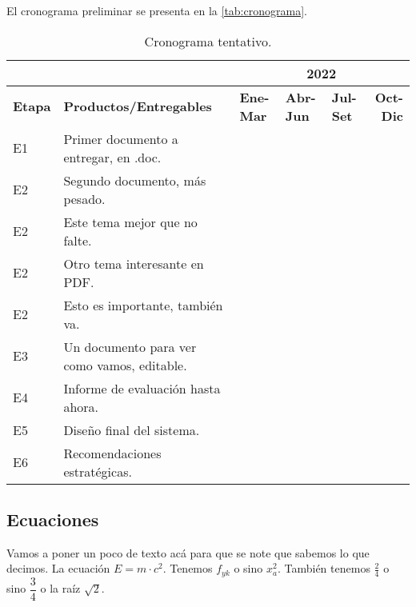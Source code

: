 El cronograma preliminar se presenta en la \autoref{tab:cronograma}.
	
\begin{table}[h]
	\centering
	\caption{Cronograma tentativo.}
	{\color{grayblack}
	\begin{tabular}{p{2.2em}p{14em}lllr}
		\multicolumn{1}{l}{} & \multicolumn{1}{r}{} & \multicolumn{4}{c}{\textbf{2022}} \\
		\midrule
		\textbf{Etapa} & \textbf{Productos/Entregables} & \multicolumn{1}{p{4.055em}}{\textbf{Ene-Mar}} & \multicolumn{1}{p{4.055em}}{\textbf{Abr-Jun}} & \multicolumn{1}{p{4.055em}}{\textbf{Jul-Set}} & \multicolumn{1}{p{4.055em}}{\textbf{Oct-Dic}} \\
		\midrule
		E1    & Primer documento a entregar, en .doc. &       & \cellcolor[rgb]{ .718,  .871,  .91} &       &  \\
		E2    & Segundo documento, más pesado. & \cellcolor[rgb]{ .776,  .89,  .859} &       &       &  \\
		E2    & Este tema mejor que no falte. &       & \cellcolor[rgb]{ .776,  .89,  .859} &       &  \\
		E2    & Otro tema interesante en PDF. &       &       & \cellcolor[rgb]{ .776,  .89,  .859} &  \\
		E2    & Esto es importante, también va. &       &       & \cellcolor[rgb]{ .776,  .89,  .859} &  \\
		E3    & Un documento para ver como vamos, editable. &       & \cellcolor[rgb]{ .722,  .804,  .894} &       &  \\
		E4    & Informe de evaluación hasta ahora. &       & \cellcolor[rgb]{ .722,  .804,  .894} &       &  \\
		E5    & Diseño final del sistema. &       &       &       & \cellcolor[rgb]{ .722,  .804,  .894} \\
		E6    & Recomendaciones estratégicas. &       &       &       & \cellcolor[rgb]{ .722,  .804,  .894} \\
		\bottomrule
	\end{tabular}}
	\label{tab:cronograma}%
\end{table}%


\subsection{Ecuaciones}
Vamos a poner un poco de texto acá para que se note que sabemos lo que decimos. La ecuación $ E=m\cdot c^2 $. Tenemos $ f_{yk} $ o sino $ x_{a}^{2} $. También tenemos $ \frac{2}{4} $ o sino $ \dfrac{3}{4} $ o la raíz $ \sqrt{2} $.

